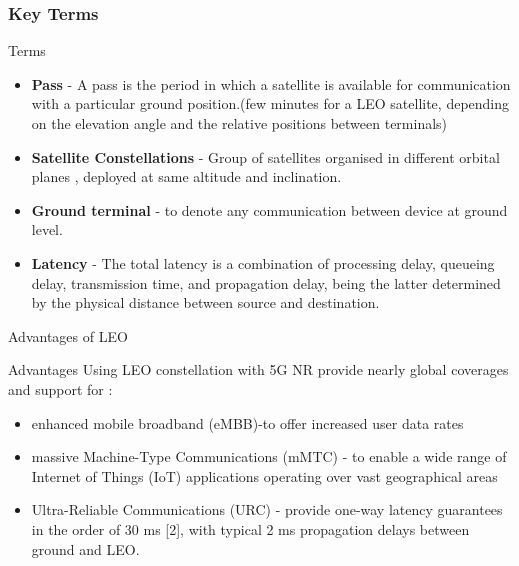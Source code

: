 \documentclass{beamer}
\begin{document}
\begin{frame}
\frametitle{Key Terms}
\begin{block}{Terms}
\begin{itemize}
    \item  \textbf{Pass}  - A pass is the period in which
a satellite is available for communication with a particular
ground position.(few minutes for a LEO satellite, depending on the elevation angle and the relative positions between terminals) 
   \item \textbf{Satellite Constellations} - Group of satellites
organised in different orbital planes , deployed at same altitude and inclination.
    \item \textbf{Ground terminal} - to denote any communication between device at ground level.
    \item \textbf{Latency} - The total latency is a combination of processing delay, queueing delay, transmission time, and propagation delay, being the latter determined by the physical distance between source and destination.
\end{itemize}
\end{block}
\end{frame}

\begin{frame}{Advantages of LEO}
\begin{block}{Advantages}
Using LEO constellation with  5G NR provide nearly global coverages and support for :
\begin{itemize}
        \item enhanced mobile broadband (eMBB)-to offer increased user data rates
        \item massive Machine-Type Communications (mMTC) - to enable a wide range of Internet of Things (IoT) applications operating over vast geographical areas
        \item Ultra-Reliable Communications (URC) -  provide one-way latency guarantees in the order of 30 ms [2], with typical 2 ms propagation delays between ground and LEO.
\end{itemize}
\end{block}
%     

\end{frame}
    
\end{document}
